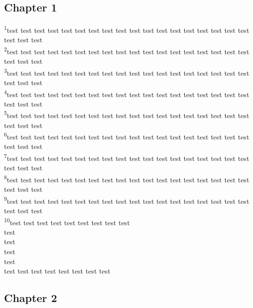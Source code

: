 \documentclass[10pt,twocolumn]{memoir}
\newcommand{\verseref}[2]{\textsuperscript{#2}}
\begin{document}
\chapter*{}

\section*{Chapter 1}

\noindent
\verseref{1}{1}test test test test test test test test test test test test test test test test test test test test test\\ 
\verseref{1}{2}test test test test test test test test test test test test test test test test test test test test test\\ 
\verseref{1}{3}test test test test test test test test test test test test test test test test test test test test test\\ 
\verseref{1}{4}test test test test test test test test test test test test test test test test test test test test test\\ 
\verseref{1}{5}test test test test test test test test test test test test test test test test test test test test test\\ 
\verseref{1}{6}test test test test test test test test test test test test test test test test test test test test test\\ 
\verseref{1}{7}test test test test test test test test test test test test test test test test test test test test test\\ 
\verseref{1}{8}test test test test test test test test test test test test test test test test test test test test test\\ 
\verseref{1}{9}test test test test test test test test test test test test test test test test test test test test test\\ 
\verseref{1}{10}test test test test test test test test test\\ test\\ test\\ test\\ test\\ test test test test test test test test\\ 

\section*{Chapter 2}
\end{document}
